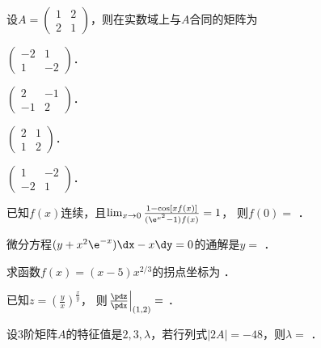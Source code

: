 \documentclass[plain,noanswer,medmath]{../../template/jnuexam}
\begin{document}


\begin{problem}
设$A = \begin{pmatrix}
  1 & 2 \\
  2 & 1
\end{pmatrix}$，则在实数域上与$A$合同的矩阵为\pickout{}
\begin{abcd}
\item $\begin{pmatrix}
  -2 & 1 \\
   1 & -2
\end{pmatrix}$．
\item $\begin{pmatrix}
   2 & -1 \\
  -1 & 2
\end{pmatrix}$．
\item $\begin{pmatrix}
  2 & 1 \\
  1 & 2
\end{pmatrix}$．
\item $\begin{pmatrix}
   1 & -2 \\
  -2 & 1
\end{pmatrix}$．
\end{abcd}
\end{problem}




\begin{problem}
已知$f(x)$连续，且$\lim_{x \to 0} \frac{1 - \cos[xf(x)]}{(\e^{x^2} - 1)f(x)} = 1$，
则$f(0) =$ \fillin{}．
\end{problem}


\begin{problem}
微分方程$(y + x^2\e^{- x})\dx - x\dy = 0$的通解是$y =$ \fillin{}．
\end{problem}




\begin{problem}
求函数$f(x) = (x - 5)x^{2/3}$的拐点坐标为 \fillin{}．
\end{problem}


\begin{problem}
已知$z = \left(\frac{y}{x} \right)^{\frac{x}{y}}$，
则$\left. \frac{\pdz}{\pdx} \right|_{(1,2)} =$ \fillin{}．
\end{problem}


\begin{problem}
设$3$阶矩阵$A$的特征值是$2,3,\lambda$，若行列式$|2A| = - 48$，则$\lambda =$ \fillin{}．
\end{problem}
\end{document}
